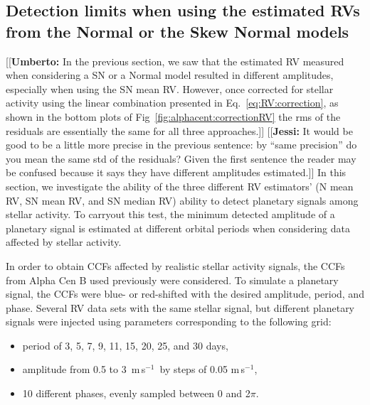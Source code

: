 \documentclass{aa}
\def\ms{\hbox{\,m\,s$^{-1}$}}         %
\newcommand{\jessi}[1]{{\color{Purple}[[\textbf{Jessi: }#1]]}}
\newcommand{\umberto}[1]{{\color{green}[[\textbf{Umberto: }#1]]}}
\begin{document}
\subsection{Detection limits when using the estimated RVs from the Normal or the Skew Normal models} \label{sec:detect_limits}

\umberto{In the previous section, we saw that the estimated RV measured when considering a SN or a Normal model resulted in different amplitudes, especially when using the SN mean RV. However, once corrected for stellar activity using the linear combination presented in Eq.~\ref{eq:RV:correction}, as shown in the bottom plots of Fig~\ref{fig:alphacent:correctionRV} the rms of the residuals are essentially the same for all three approaches.} \jessi{It would be good to be a little more precise in the previous sentence:  by ``same precision'' do you mean the same std of the residuals?  Given the first sentence the reader may be confused because it says they have different amplitudes estimated.}
In this section, we investigate the ability of the three different RV estimators' (N mean RV, SN mean RV, and SN median RV) ability to detect planetary signals among stellar activity.
To carryout this test, the minimum detected amplitude of a planetary signal is estimated at different orbital periods when considering data affected by stellar activity.

In order to obtain CCFs affected by realistic stellar activity signals, the CCFs from Alpha Cen B used previously were considered. 
To simulate a planetary signal, the CCFs were blue- or red-shifted with the desired amplitude, period, and phase.
Several RV data sets with the same stellar signal, but different planetary signals were injected using parameters corresponding to the following grid:
\begin{itemize}
\item period of 3, 5, 7, 9, 11, 15, 20, 25, and 30 days,
\item amplitude from 0.5 to 3 \ms\, by steps of 0.05\,\ms,
\item 10 different phases, evenly sampled between 0 and 2$\pi$.
\end{itemize}
\end{document}
